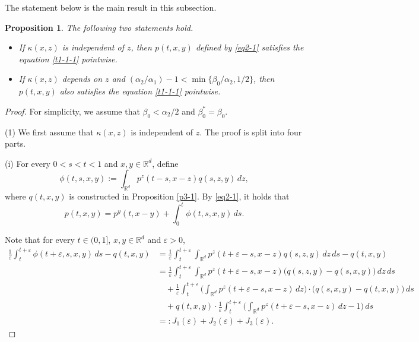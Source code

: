 \documentclass[a4paper,11pt]{amsart}
\newcommand{\R}{\mathds R}
\newcommand{\B}{\beta}
\newcommand{\K}{\kappa}
\newcommand{\A}{\alpha}
\newcommand{\e}{ \varepsilon}
\newtheorem{proposition}[theorem]{Proposition}
\theoremstyle{definition}
\begin{document}
 The statement below is the main result in this subsection.

\begin{proposition}\label{t4-1}
The following two statements hold.
\begin{itemize}
\item [(1)] If $\K(x,z)$ is independent of $z$, then $p(t,x,y)$ defined by \eqref{eq2-1} satisfies the equation \eqref{t1-1-1}
pointwise.

\item[(2)] If $\K(x,z)$ depends on $z$ and ${(\A_2/\A_1)}-1<\min\{{\B_0}/{\A_2},{1}/{2}\}$, then
  $p(t,x,y)$ also satisfies the equation \eqref{t1-1-1}
	pointwise.
  \end{itemize}
\end{proposition}
\begin{proof}
For simplicity, we assume that $\B_0< {\A_2}/{2}$ and $\B_0^*=\B_0$.


{(1)} We first assume that $\K(x,z)$ is independent of $z$. The proof is split into four parts.

{(i)} For every $0<s<t<1$ and $x,y \in \R^d$, define
\begin{equation*}
\phi(t,s,x,y):=\int_{\R^d}p^z(t-s,x-z)q(s,z,y)\,dz,
\end{equation*}
where $q(t,x,y)$ is constructed in Proposition \ref{p3-1}.
By \eqref{eq2-1}, it holds that
\begin{equation}\label{t4-1-1}
p(t,x,y)=p^y(t,x-y)+\int_0^t \phi(t,s,x,y)\,ds.
\end{equation}

Note that for every $t \in (0,1]$, $x,y\in \R^d$ and $\e>0$,
\begin{align*}
 \frac{1}{\e}\int_t^{t+\e}\phi(t+\e,s,x,y)\,ds-q(t,x,y)
&= \frac{1}{\e}\int_t^{t+\e}\int_{\R^d}p^z(t+\e-s,x-z)q(s,z,y)\,dz\,ds-q(t,x,y)\\
&=\frac{1}{\e}\int_t^{t+\e}\int_{\R^d}p^z(t+\e-s,x-z)\big(
q(s,z,y)-q(s,x,y)\big)\,dz\,ds\\
&\quad +\frac{1}{\e}\int_t^{t+\e}\bigg(
\int_{\R^d} p^z(t+\e-s,x-z)\,dz\bigg)\cdot \big(q(s,x,y)-q(t,x,y)\big)\,ds\\
&\quad +q(t,x,y)\cdot\frac{1}{\e}\int_t^{t+\e}\bigg(\int_{\R^d} p^z(t+\e-s,x-z)\,dz-1\bigg)\,ds\\
&=:J_1(\e)+J_2(\e)+J_3(\e).
\end{align*}


\end{proof}
\end{document}

